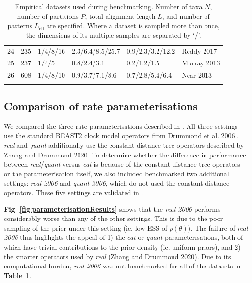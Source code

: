 \documentclass[10pt,letterpaper]{article}
\begin{document}
\begin{table}[h!]
\begin{tabular}{|l| l l l l l|}
24  &  235  &  1/4/8/16  &  2.3/6.4/8.5/25.7  &  0.9/2.3/3.2/12.2  &  Reddy 2017 \cite{Reddy_2017} \\ 

25  &  237  &  1/4/5  &  0.8/2.4/3.1  &  0.2/1.2/1.5  &  Murray 2013 \cite{Murray_2013} \\ 

26  &  608  &  1/4/8/10  &  0.9/3.7/7.1/8.6  &  0.7/2.8/5.4/6.4  &  Near 2013 \cite{Near_2013} \\ 





 &&&&& \\
 \hline
\end{tabular}
\caption{Empirical datasets used during benchmarking. Number of taxa $N$, number of partitions $P$, total alignment length $L$, and number of patterns $L_\text{eff}$ are specified. Where a dataset is sampled more than once, the dimensions of its multiple samples are separated by `/'.  }
\label{table:datasets}
\end{table}






\subsection*{Comparison of rate parameterisations}

We compared the three rate parameterisations described in \textbf{}. All three settings use the standard BEAST2 clock model operators from Drummond et al. 2006 \cite{drummond2006relaxed}. \textit{real} and \textit{quant} additionally use the constant-distance tree operators described by Zhang and Drummond 2020. To determine whether the difference in performance between \textit{real}/\textit{quant} versus \textit{cat} is because of the constant-distance tree operators or the parameterisation itself, we also included benchmarked two additional settings: \textit{real 2006} and \textit{quant 2006}, which do not used the constant-distance operators. These five settings are validated in \textbf{}.


\textbf{Fig. \ref{fig:parameterisationResults}} shows that the \textit{real 2006} performs considerably worse than any of the other settings. This is due to the poor sampling of the prior under this setting (ie. low ESS of $p(\theta)$). The failure of \textit{real 2006} thus highlights the appeal of 1) the \textit{cat} or \textit{quant} parameterisations, both of which have trivial contributions to the prior density (ie. uniform priors), and 2) the smarter operators used by \textit{real} (Zhang and Drummond 2020). Due to its computational burden, \textit{real 2006} was not benchmarked for all of the datasets in \textbf{Table \ref{table:datasets}}.
\end{document}

